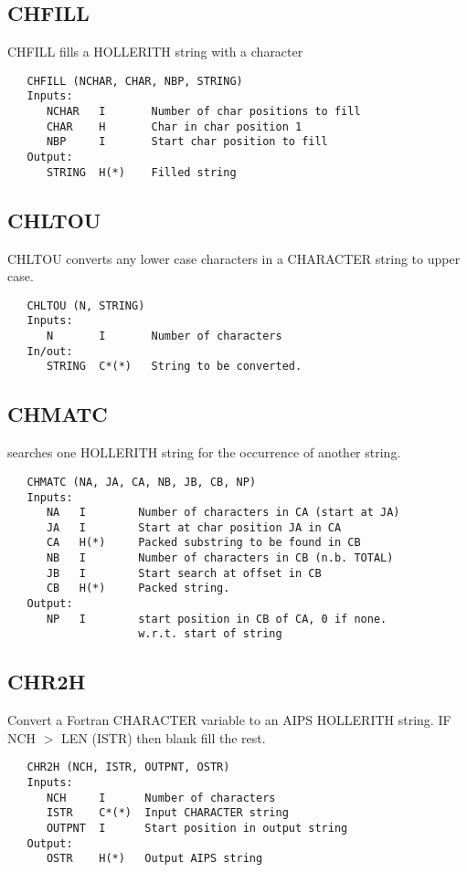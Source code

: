 \subsection{CHFILL}
CHFILL fills a HOLLERITH string with a character
\begin{verbatim}
   CHFILL (NCHAR, CHAR, NBP, STRING)
   Inputs:
      NCHAR   I       Number of char positions to fill
      CHAR    H       Char in char position 1
      NBP     I       Start char position to fill
   Output:
      STRING  H(*)    Filled string
\end{verbatim}

\subsection{CHLTOU}
CHLTOU converts any lower case characters in a CHARACTER string to
upper case.
\begin{verbatim}
   CHLTOU (N, STRING)
   Inputs:
      N       I       Number of characters
   In/out:
      STRING  C*(*)   String to be converted.
\end{verbatim}

\subsection{CHMATC}
searches one HOLLERITH string for the occurrence of another string.
\begin{verbatim}
   CHMATC (NA, JA, CA, NB, JB, CB, NP)
   Inputs:
      NA   I        Number of characters in CA (start at JA)
      JA   I        Start at char position JA in CA
      CA   H(*)     Packed substring to be found in CB
      NB   I        Number of characters in CB (n.b. TOTAL)
      JB   I        Start search at offset in CB
      CB   H(*)     Packed string.
   Output:
      NP   I        start position in CB of CA, 0 if none.
                    w.r.t. start of string
\end{verbatim}

\subsection{CHR2H}
Convert a Fortran CHARACTER variable to an AIPS HOLLERITH string.
IF NCH $>$ LEN (ISTR) then blank fill the rest.
\begin{verbatim}
   CHR2H (NCH, ISTR, OUTPNT, OSTR)
   Inputs:
      NCH     I      Number of characters
      ISTR    C*(*)  Input CHARACTER string
      OUTPNT  I      Start position in output string
   Output:
      OSTR    H(*)   Output AIPS string
\end{verbatim}

